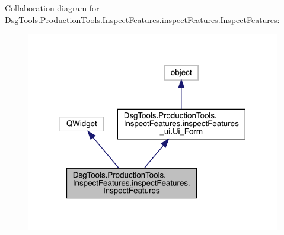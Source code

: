Collaboration diagram for Dsg\+Tools.\+Production\+Tools.\+Inspect\+Features.\+inspect\+Features.\+Inspect\+Features\+:
\nopagebreak
\begin{figure}[H]
\begin{center}
\leavevmode
\includegraphics[width=314pt]{class_dsg_tools_1_1_production_tools_1_1_inspect_features_1_1inspect_features_1_1_inspect_features__coll__graph}
\end{center}
\end{figure}
